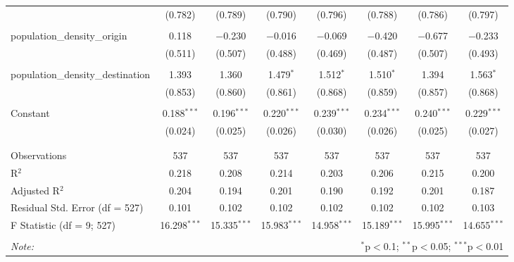 \begin{table}[!htbp]
\begin{tabular}{@{\extracolsep{5pt}}lccccccc}
  & (0.782) & (0.789) & (0.790) & (0.796) & (0.788) & (0.786) & (0.797) \\ 
  & & & & & & & \\ 
 population\_density\_origin & 0.118 & $-$0.230 & $-$0.016 & $-$0.069 & $-$0.420 & $-$0.677 & $-$0.233 \\ 
  & (0.511) & (0.507) & (0.488) & (0.469) & (0.487) & (0.507) & (0.493) \\ 
  & & & & & & & \\ 
 population\_density\_destination & 1.393 & 1.360 & 1.479$^{*}$ & 1.512$^{*}$ & 1.510$^{*}$ & 1.394 & 1.563$^{*}$ \\ 
  & (0.853) & (0.860) & (0.861) & (0.868) & (0.859) & (0.857) & (0.868) \\ 
  & & & & & & & \\ 
 Constant & 0.188$^{***}$ & 0.196$^{***}$ & 0.220$^{***}$ & 0.239$^{***}$ & 0.234$^{***}$ & 0.240$^{***}$ & 0.229$^{***}$ \\ 
  & (0.024) & (0.025) & (0.026) & (0.030) & (0.026) & (0.025) & (0.027) \\ 
  & & & & & & & \\ 
\hline \\[-1.8ex] 
Observations & 537 & 537 & 537 & 537 & 537 & 537 & 537 \\ 
R$^{2}$ & 0.218 & 0.208 & 0.214 & 0.203 & 0.206 & 0.215 & 0.200 \\ 
Adjusted R$^{2}$ & 0.204 & 0.194 & 0.201 & 0.190 & 0.192 & 0.201 & 0.187 \\ 
Residual Std. Error (df = 527) & 0.101 & 0.102 & 0.102 & 0.102 & 0.102 & 0.102 & 0.103 \\ 
F Statistic (df = 9; 527) & 16.298$^{***}$ & 15.335$^{***}$ & 15.983$^{***}$ & 14.958$^{***}$ & 15.189$^{***}$ & 15.995$^{***}$ & 14.655$^{***}$ \\ 
\hline 
\hline \\[-1.8ex] 
\textit{Note:}  & \multicolumn{7}{r}{$^{*}$p$<$0.1; $^{**}$p$<$0.05; $^{***}$p$<$0.01} \\ 
\end{tabular} 
\end{table} 
